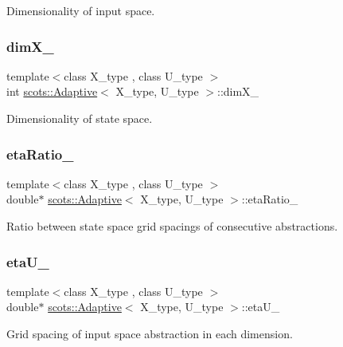 Dimensionality of input space. \mbox{\label{classscots_1_1Adaptive_a852e87d359ae3c0fe13493bac80f35f6}} 
\subsubsection{\texorpdfstring{dim\+X\+\_\+}{dimX\_}}
{\footnotesize\ttfamily template$<$class X\+\_\+type , class U\+\_\+type $>$ \\
int \hyperlink{classscots_1_1Adaptive}{scots\+::\+Adaptive}$<$ X\+\_\+type, U\+\_\+type $>$\+::dim\+X\+\_\+}

Dimensionality of state space. \mbox{\label{classscots_1_1Adaptive_af0ae9692bf76a9d38cca670e9535310f}} 
\subsubsection{\texorpdfstring{eta\+Ratio\+\_\+}{etaRatio\_}}
{\footnotesize\ttfamily template$<$class X\+\_\+type , class U\+\_\+type $>$ \\
double$\ast$ \hyperlink{classscots_1_1Adaptive}{scots\+::\+Adaptive}$<$ X\+\_\+type, U\+\_\+type $>$\+::eta\+Ratio\+\_\+}

Ratio between state space grid spacings of consecutive abstractions. \mbox{\label{classscots_1_1Adaptive_acc2e430a31aa9ceb8ab6593a9eb3e91f}} 
\subsubsection{\texorpdfstring{eta\+U\+\_\+}{etaU\_}}
{\footnotesize\ttfamily template$<$class X\+\_\+type , class U\+\_\+type $>$ \\
double$\ast$ \hyperlink{classscots_1_1Adaptive}{scots\+::\+Adaptive}$<$ X\+\_\+type, U\+\_\+type $>$\+::eta\+U\+\_\+}

Grid spacing of input space abstraction in each dimension. \mbox{\label{classscots_1_1Adaptive_abe9d5faea4bd01753070599200e224c5}} 

